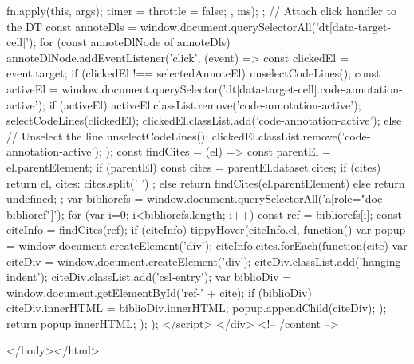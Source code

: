 {{{{{                fn.apply(this, args);
                timer = throttle = false;
              }, ms);
          }
        };
      }
        // Attach click handler to the DT
        const annoteDls = window.document.querySelectorAll('dt[data-target-cell]');
        for (const annoteDlNode of annoteDls) {
          annoteDlNode.addEventListener('click', (event) => {
            const clickedEl = event.target;
            if (clickedEl !== selectedAnnoteEl) {
              unselectCodeLines();
              const activeEl = window.document.querySelector('dt[data-target-cell].code-annotation-active');
              if (activeEl) {
                activeEl.classList.remove('code-annotation-active');
              }
              selectCodeLines(clickedEl);
              clickedEl.classList.add('code-annotation-active');
            } else {
              // Unselect the line
              unselectCodeLines();
              clickedEl.classList.remove('code-annotation-active');
            }
          });
        }
    const findCites = (el) => {
      const parentEl = el.parentElement;
      if (parentEl) {
        const cites = parentEl.dataset.cites;
        if (cites) {
          return {
            el,
            cites: cites.split(' ')
          };
        } else {
          return findCites(el.parentElement)
        }
      } else {
        return undefined;
      }
    };
    var bibliorefs = window.document.querySelectorAll('a[role="doc-biblioref"]');
    for (var i=0; i<bibliorefs.length; i++) {
      const ref = bibliorefs[i];
      const citeInfo = findCites(ref);
      if (citeInfo) {
        tippyHover(citeInfo.el, function() {
          var popup = window.document.createElement('div');
          citeInfo.cites.forEach(function(cite) {
            var citeDiv = window.document.createElement('div');
            citeDiv.classList.add('hanging-indent');
            citeDiv.classList.add('csl-entry');
            var biblioDiv = window.document.getElementById('ref-' + cite);
            if (biblioDiv) {
              citeDiv.innerHTML = biblioDiv.innerHTML;
            }
            popup.appendChild(citeDiv);
          });
          return popup.innerHTML;
        });
      }
    }
  });
  </script>
</div> <!-- /content -->




</body></html>